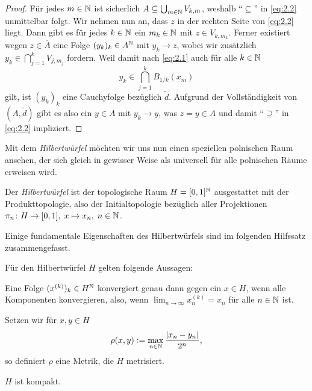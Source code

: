 \documentclass[../main/main.tex]{subfiles}
\begin{document}
\begin{proof}
		Für jedes $m \in \mathbb{N}$ ist sicherlich $A \subseteq 
		\bigcup_{m \in \mathbb{N}} V_{k, m}$, weshalb \enquote{$\subseteq$} 
		in \eqref{eq:2.2} unmittelbar folgt.
		Wir nehmen nun an, dass $z$ in der rechten Seite von \eqref{eq:2.2} liegt. 
		Dann gibt es für jedes $k \in \mathbb{N}$ ein $m_k \in \mathbb{N}$ mit $z \in V_{k, m_k}$. 
		Ferner existiert wegen $z \in \overline{A}$ eine Folge $(y_k)_k \in A^{\mathbb{N}}$ 
		mit $y_k \to z$, wobei wir zusätzlich
		$y_k \in \bigcap_{j=1}^{k} V_{j, m_j}$
		fordern. Weil damit nach \eqref{eq:2.1} auch für alle $k \in \mathbb{N}$
		\[y_k \in \bigcap_{j=1}^{k} B_{1/k}(x_m)\]
		gilt, ist $(y_k)_k$ eine Cauchyfolge bezüglich $\tilde{d}$. Aufgrund der Vollständigkeit von 
		$(A, \tilde{d})$ gibt es also ein $y \in A$ mit $y_k \to y$, was 
		$z = y \in A$ und damit \enquote{$\supseteq$} 
		in \eqref{eq:2.2} impliziert.
	\end{proof}
	
	Mit dem \emph{Hilbertwürfel} möchten wir uns nun einen speziellen polnischen Raum ansehen, 
	der sich gleich in gewisser Weise als universell für alle polnischen Räume erweisen wird.
	
	\begin{Definition}[Hilbertwürfel]
		Der \emph{Hilbertwürfel} ist der topologische Raum $H = [0, 1]^{\mathbb{N}}$ 
		ausgestattet mit der Produkttopologie, also der Initialtopologie bezüglich 
		aller Projektionen $\pi_n \colon H \to [0, 1], \; x \mapsto x_n , \; n \in \mathbb{N}$.
	\end{Definition}
	
	Einige fundamentale Eigenschaften des Hilbertwürfels sind im folgenden Hilfssatz zusammengefasst.
	
	\begin{Hilfssatz}
		\label{lem:hilbertcube}
		Für den Hilbertwürfel $H$ gelten folgende Aussagen:
		\begin{enumeratethm}
			\item Eine Folge $(x^{(k)})_k \in H^{\mathbb{N}}$ konvergiert genau dann gegen 
			ein $x \in H$, wenn alle Komponenten konvergieren, also, wenn
			$\lim_{n \to \infty} x_n^{(k)} = x_n$ für alle $n \in \mathbb{N}$ ist.
			\item Setzen wir für $x, y \in H$
			$$\rho(x, y) \vcentcolon = \max_{n \in \mathbb{N}} \frac{|x_n - y_n|}{2^n} \text{,}$$
			so definiert $\rho$ eine Metrik, die $H$ metrisiert.
			\item $H$ ist kompakt.
		\end{enumeratethm}
	\end{Hilfssatz}
	
\end{document}
